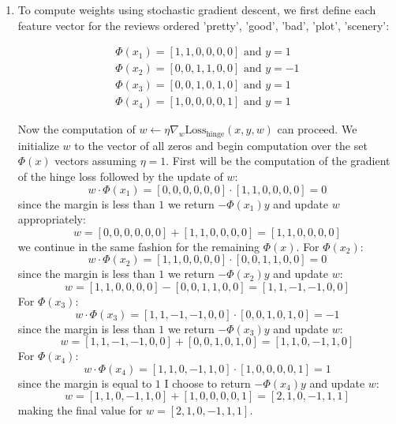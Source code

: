 \documentclass[12pt]{article}
\begin{document}
	\begin{enumerate}[label=(\alph*)]
		\item To compute weights using stochastic gradient descent, we first
			define each feature vector for the reviews ordered
			{'pretty', 'good', 'bad', 'plot', 'scenery'}:

			\begin{gather*}
				\Phi(x_1) = [1, 1, 0, 0, 0, 0] \text{ and } y = 1 \\
				\Phi(x_2) = [0, 0, 1, 1, 0, 0] \text{ and } y = -1 \\
				\Phi(x_3) = [0, 0, 1, 0, 1, 0] \text{ and } y = 1 \\
				\Phi(x_4) = [1, 0, 0, 0, 0, 1] \text{ and } y = 1
			\end{gather*}

			Now the computation of
			\(w \leftarrow \eta \nabla_w \text{Loss}_\text{hinge}(x,y,w)\)
			can proceed.
			We initialize \(w\) to the vector of all zeros and begin computation
			over the set \(\Phi(x)\) vectors assuming \(\eta = 1\). First will
			be the computation of the gradient of the hinge loss followed by
			the update of \(w\):
			\[
				w \cdot \Phi(x_1) = [0, 0, 0, 0, 0, 0] \cdot [1, 1, 0, 0, 0, 0] = 0
			\]
			since the margin is less than \(1\) we return \(-\Phi(x_1)y\) and update
			\(w\) appropriately:
			\[
				w = [0, 0, 0, 0, 0, 0] + [1, 1, 0, 0, 0, 0] = [1, 1, 0, 0, 0, 0]
			\]
			we continue in the same fashion for the remaining \(\Phi(x)\).
			For \(\Phi(x_2)\):
			\[
				w \cdot \Phi(x_2) = [1, 1, 0, 0, 0, 0] \cdot [0, 0, 1, 1, 0, 0] = 0
			\]
			since the margin is less than \(1\) we return \(-\Phi(x_2)y\) and update
			\(w\):
			\[
				w = [1, 1, 0, 0, 0, 0] - [0, 0, 1, 1, 0, 0] = [1, 1, -1, -1, 0, 0]
			\]
			For \(\Phi(x_3)\):
			\[
				w \cdot \Phi(x_3) = [1, 1, -1, -1, 0, 0] \cdot [0, 0, 1, 0, 1, 0] = -1
			\]
			since the margin is less than \(1\) we return \(-\Phi(x_3)y\) and update
			\(w\):
			\[
				w = [1, 1, -1, -1, 0, 0] + [0, 0, 1, 0, 1, 0] = [1, 1, 0, -1, 1, 0]
			\]
			For \(\Phi(x_4)\):
			\[
				w \cdot \Phi(x_4) = [1, 1, 0, -1, 1, 0] \cdot [1, 0, 0, 0, 0, 1] = 1
			\]
			since the margin is equal to \(1\) I choose to return
			\(-\Phi(x_4)y\) and update \(w\):
			\[
				w = [1, 1, 0, -1, 1, 0] + [1, 0, 0, 0, 0, 1] = [2, 1, 0, -1, 1, 1]
			\]
			making the final value for \(w = [2, 1, 0, -1, 1, 1]\).


\end{enumerate}
\end{document}
